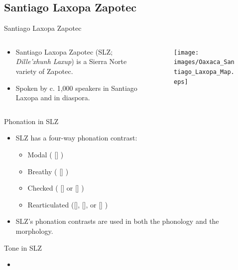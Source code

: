 \documentclass{beamer}
\begin{document}
\subsection{Santiago Laxopa Zapotec}

\begin{frame}{Santiago Laxopa Zapotec}
  \begin{columns}
    \begin{column}{0.33\textwidth}
      \begin{itemize}
        \item Santiago Laxopa Zapotec (SLZ; \textit{Dille'xhunh Laxup}) is a Sierra Norte variety of Zapotec.
        \item Spoken by c. 1,000 speakers in Santiago Laxopa and in diaspora.
      \end{itemize}
    \end{column}
    \begin{column}{0.67\textwidth}
      \begin{figure}
        \centering
        \texttt{[image: images/Oaxaca\_Santiago\_Laxopa\_Map.eps]}
      \end{figure}
    \end{column}
  \end{columns}
\end{frame}

\begin{frame}{Phonation in SLZ}
  \begin{itemize}
    \item SLZ has a four-way phonation contrast:
    \begin{itemize}
      \item Modal ( [] )
      \item Breathy ( [] )
      \item Checked ( [] or [] )
      \item Rearticulated ([], [], or [] )
    \end{itemize}
    \item SLZ's phonation contrasts are used in both the phonology and the morphology.
  \end{itemize}
\end{frame}

\begin{frame}{Tone in SLZ}
  \begin{itemize}
    \item 
  \end{itemize}
\end{frame}
\end{document}
